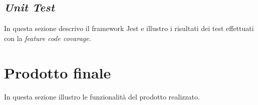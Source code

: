 \subsection{\emph{Unit Test}}
In questa sezione descrivo il framework Jest e illustro i risultati dei test effettuati con la \emph{feature code covarage}.

\section{Prodotto finale}
In questa sezione illustro le funzionalità del prodotto realizzato.